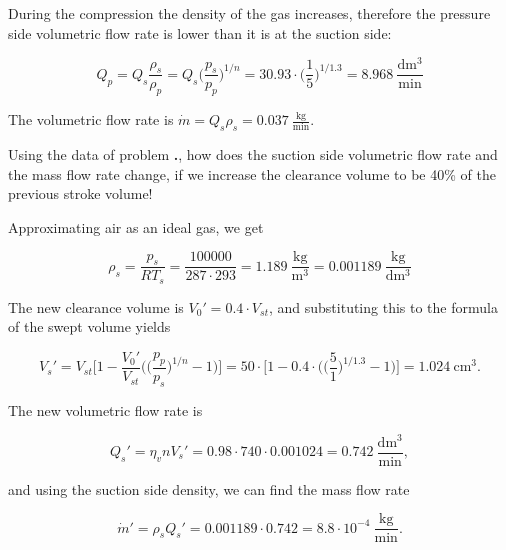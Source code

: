 During the compression the density of the gas increases, therefore the pressure side volumetric flow rate is lower than it is at the suction side:

\begin{equation}
Q_p = Q_s \frac{\rho_s}{\rho_p} = Q_s \Big(\frac{p_s}{p_p}\Big)^{1/n} = 30.93\cdot \Big( \frac{1}{5} \Big)^{1/1.3} = 8.968~\frac{\mathrm{dm^3}}{\mathrm{min}}
\end{equation}


The volumetric flow rate is $\dot{m} = Q_s \rho_s = 0.037~\frac{\mathrm{kg}}{\mathrm{min}}$. 

\vspace{1cm}

Using the data of problem {\bf \thesection.\theprob}, how does the suction side volumetric flow rate and the mass flow rate change, if we increase the clearance volume to be 40\% of the previous stroke volume!


Approximating air as an ideal gas, we get

\begin{equation}
\rho_s = \frac{p_s}{RT_s} = \frac{100000}{287\cdot 293} = 1.189~\frac{\mathrm{kg}}{\mathrm{m^3}} = 0.001189~\frac{\mathrm{kg}}{\mathrm{dm^3}}
\end{equation}

The new clearance volume is $V_0' = 0.4\cdot V_{st}$, and substituting this to the formula of the swept volume yields

\begin{equation}
V_s' = V_{st} \Bigg[1-\frac{V_0'}{V_{st}} \Bigg( \Big(\frac{p_p}{p_s}\Big)^{1/n} - 1 \Bigg) \Bigg] = 50\cdot \Bigg[1-0.4\cdot \Bigg( \Big(\frac{5}{1}\Big)^{1/1.3} - 1 \Bigg) \Bigg] = 1.024~\mathrm{cm^3}.
\end{equation}

The new volumetric flow rate is

\begin{equation}
Q_s' = \eta_v n V_s' = 0.98\cdot 740 \cdot 0.001024 = 0.742~\frac{\mathrm{dm^3}}{\mathrm{min}},
\end{equation}

and using the suction side density, we can find the mass flow rate

\begin{equation}
\dot{m}' = \rho_s Q_s' = 0.001189\cdot 0.742 = 8.8\cdot 10^{-4}~\frac{\mathrm{kg}}{\mathrm{min}}.
\end{equation}

